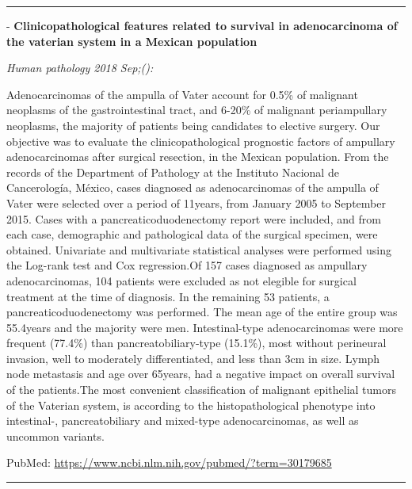 \documentclass[]{article}
\begin{document}
{}

{}

\begin{center}\rule{0.5\linewidth}{\linethickness}\end{center}

 - \textbf{Clinicopathological features related to survival in
adenocarcinoma of the vaterian system in a Mexican population}

\emph{Human pathology 2018 Sep;():}

Adenocarcinomas of the ampulla of Vater account for 0.5\% of malignant
neoplasms of the gastrointestinal tract, and 6-20\% of malignant
periampullary neoplasms, the majority of patients being candidates to
elective surgery. Our objective was to evaluate the clinicopathological
prognostic factors of ampullary adenocarcinomas after surgical
resection, in the Mexican population. From the records of the Department
of Pathology at the Instituto Nacional de Cancerología, México, cases
diagnosed as adenocarcinomas of the ampulla of Vater were selected over
a period of 11years, from January 2005 to September 2015. Cases with a
pancreaticoduodenectomy report were included, and from each case,
demographic and pathological data of the surgical specimen, were
obtained. Univariate and multivariate statistical analyses were
performed using the Log-rank test and Cox regression.Of 157 cases
diagnosed as ampullary adenocarcinomas, 104 patients were excluded as
not elegible for surgical treatment at the time of diagnosis. In the
remaining 53 patients, a pancreaticoduodenectomy was performed. The mean
age of the entire group was 55.4years and the majority were men.
Intestinal-type adenocarcinomas were more frequent (77.4\%) than
pancreatobiliary-type (15.1\%), most without perineural invasion, well
to moderately differentiated, and less than 3cm in size. Lymph node
metastasis and age over 65years, had a negative impact on overall
survival of the patients.The most convenient classification of malignant
epithelial tumors of the Vaterian system, is according to the
histopathological phenotype into intestinal-, pancreatobiliary and
mixed-type adenocarcinomas, as well as uncommon variants.

PubMed: \url{https://www.ncbi.nlm.nih.gov/pubmed/?term=30179685}

{}

{}

\begin{center}\rule{0.5\linewidth}{\linethickness}\end{center}
\end{document}
